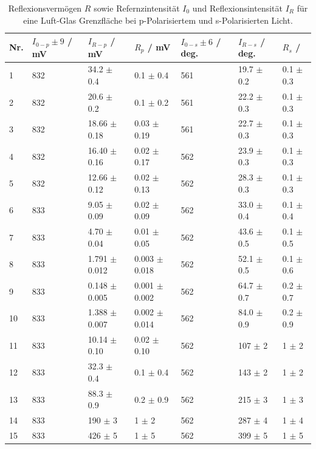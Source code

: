 \documentclass[12pt,a4paper,twoside]{article}
\begin{document}
\begin{table}[H]
    \centering
    \caption{Reflexionsvermögen $R$ sowie Refernzintensität $I_0$ und Reflexionsintensität $I_R$ für eine Luft-Glas Grenzfläche bei p-Polarisiertem und s-Polarisierten Licht.}
    \label{tab:reflexionsvermögen luft glas}
    \begin{tabular}{| l | l | l | l | l | l | l |}
        \hline
        Nr. & $I_{0-p} \pm 9$ / mV & $I_{R-p}$ / mV & $R_p$ / mV & $I_{0-s} \pm 6$ / deg. & $I_{R-s}$ / deg. & $R_s$ / \\
        \hline
        1  & 832  & 34.2  $\pm$ 0.4     & 0.1    $\pm$ 0.4    & 561 & 19.7  $\pm$ 0.2    & 0.1 $\pm$ 0.3 \\
        2  & 832  & 20.6  $\pm$ 0.2     & 0.1    $\pm$ 0.2    & 561 & 22.2  $\pm$ 0.3    & 0.1 $\pm$ 0.3 \\
        3  & 832  & 18.66 $\pm$ 0.18    & 0.03   $\pm$ 0.19   & 561 & 22.7  $\pm$ 0.3    & 0.1 $\pm$ 0.3 \\
        4  & 832  & 16.40 $\pm$ 0.16    & 0.02   $\pm$ 0.17   & 562 & 23.9  $\pm$ 0.3    & 0.1 $\pm$ 0.3 \\
        5  & 832  & 12.66 $\pm$ 0.12    & 0.02   $\pm$ 0.13   & 562 & 28.3  $\pm$ 0.3    & 0.1 $\pm$ 0.3 \\
        6  & 833  & 9.05  $\pm$ 0.09    & 0.02   $\pm$ 0.09   & 562 & 33.0  $\pm$ 0.4    & 0.1 $\pm$ 0.4 \\
        7  & 833  & 4.70  $\pm$ 0.04    & 0.01   $\pm$ 0.05   & 562 & 43.6  $\pm$ 0.5    & 0.1 $\pm$ 0.5 \\
        8  & 833  & 1.791 $\pm$ 0.012   & 0.003  $\pm$ 0.018  & 562 & 52.1  $\pm$ 0.5    & 0.1 $\pm$ 0.6 \\
        9  & 833  & 0.148 $\pm$ 0.005   & 0.001  $\pm$ 0.002  & 562 & 64.7  $\pm$ 0.7    & 0.2 $\pm$ 0.7 \\
        10 & 833  & 1.388 $\pm$ 0.007   & 0.002  $\pm$ 0.014  & 562 & 84.0  $\pm$ 0.9    & 0.2 $\pm$ 0.9 \\
        11 & 833  & 10.14 $\pm$ 0.10    & 0.02   $\pm$ 0.10   & 562 & 107   $\pm$ 2      & 1   $\pm$ 2 \\
        12 & 833  & 32.3  $\pm$ 0.4     & 0.1    $\pm$ 0.4    & 562 & 143   $\pm$ 2      & 1   $\pm$ 2 \\
        13 & 833  & 88.3  $\pm$ 0.9     & 0.2    $\pm$ 0.9    & 562 & 215   $\pm$ 3      & 1   $\pm$ 3 \\
        14 & 833  & 190   $\pm$ 3       & 1      $\pm$ 2      & 562 & 287   $\pm$ 4      & 1   $\pm$ 4 \\
        15 & 833  & 426   $\pm$ 5       & 1      $\pm$ 5      & 562 & 399   $\pm$ 5      & 1   $\pm$ 5 \\
        \hline
    \end{tabular}
\end{table}
\end{document}
